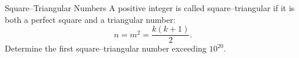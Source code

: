 \begin{problem}{Square–Triangular Numbers}
    A positive integer is called square–triangular if it is both a perfect square and a triangular number:
    \[n=m^2=\frac{k(k+1)}2.\]
    Determine the first square–triangular number exceeding \(10^{20}.\)
    
\end{problem}
